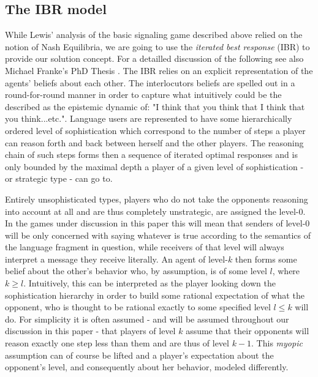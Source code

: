 \documentclass[10]{article}
\begin{document}
\subsection{The IBR model}
While Lewis' analysis of the basic signaling game described above relied on the notion of Nash Equilibria, we are going to use the \textit{iterated best response} (IBR) to provide our solution concept. For a detailled discussion of the following see also Michael Franke's PhD Thesis \cite{franke2009signal}. The IBR relies on an explicit representation of the agents' beliefs about each other. The interlocutors beliefs are spelled out in a round-for-round manner in order to capture what intuitively could be the described as the epistemic dynamic of: "I think that you think that I think that you think...etc.". Language users are represented to have some hierarchically ordered level of sophistication which correspond to the number of steps a player can reason forth and back between herself and the other players. The reasoning chain of such steps forms then a sequence of iterated optimal responses and is only bounded by the maximal depth a player of a given level of sophistication - or strategic type - can go to. 

Entirely unsophisticated types, players who do not take the opponents reasoning into account at all and are thus completely unstrategic, are assigned the level-0. In the games under discussion in this paper this will mean that senders of level-0 will be only concerned with saying whatever is true according to the semantics of the language fragment in question, while receivers of that level will always interpret a message they receive literally. An agent of level-$k$ then forms some belief about the other's behavior who, by assumption, is of some level $l$, where $k\geq l$. Intuitively, this can be interpreted as the player looking down the sophistication hierarchy in order to build some rational expectation of what the opponent, who is thought to be rational exactly to some specified level $l\leq k$ will do. For simplicity it is often assumed - and will be assumed throughout our discussion in this paper - that players of level $k$ assume that their opponents will reason exactly one step less than them and are thus of level $k-1$. This \textit{myopic} assumption can of course be lifted and a player's expectation about the opponent's level, and consequently about her behavior, modeled differently.
\end{document}
